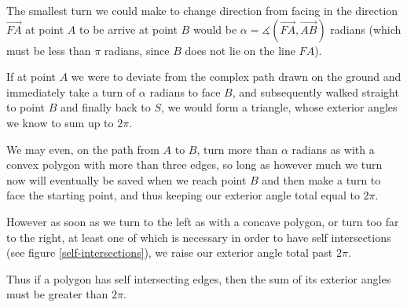 \documentclass{article}
\newcommand{\vecl}{\overrightarrow} %
\newcommand{\ang}[1]{\measuredangle\left( #1 \right)}
\begin{document}
The smallest turn we could make to change direction from facing in the direction \(\vecl{FA}\) at point \(A\) to be arrive at point \(B\) would be \(\alpha = \ang{\vecl{FA}, \vecl{AB}}\) radians (which must be less than \(\pi\) radians, since \(B\) does not lie on the line \(FA\)).

If at point \(A\) we were to deviate from the complex path drawn on the ground and immediately take a turn of \(\alpha\) radians to face \(B\), and subsequently walked straight to point \(B\) and finally back to \(S\), we would form a triangle, whose exterior angles we know to sum up to \(2\pi\).

We may even, on the path from \(A\) to \(B\), turn more than \(\alpha\) radians as with a convex polygon with more than three edges, so long as however much we turn now will eventually be saved when we reach point \(B\) and then make a turn to face the starting point, and thus keeping our exterior angle total equal to \(2\pi\).

However as soon as we turn to the left as with a concave polygon, or turn too far to the right, at least one of which is necessary in order to have self intersections (see figure \ref{self-intersections}), we raise our exterior angle total past \(2\pi\).

Thus if a polygon has self intersecting edges, then the sum of its exterior angles must be greater than \(2\pi\).
\end{document}
